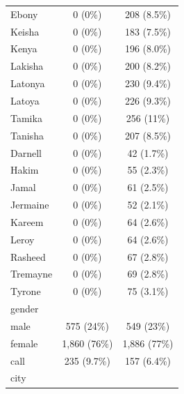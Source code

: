 \documentclass[
  11pt,
]{book}
\numberwithin{equation}{section}
\numberwithin{countremarque}{section}
\begin{document}
\begin{longtable}{lcc}
\addlinespace
\hspace{1em}Ebony & 0 (0\%) & 208 (8.5\%)\\
\hspace{1em}Keisha & 0 (0\%) & 183 (7.5\%)\\
\hspace{1em}Kenya & 0 (0\%) & 196 (8.0\%)\\
\hspace{1em}Lakisha & 0 (0\%) & 200 (8.2\%)\\
\hspace{1em}Latonya & 0 (0\%) & 230 (9.4\%)\\
\addlinespace
\hspace{1em}Latoya & 0 (0\%) & 226 (9.3\%)\\
\hspace{1em}Tamika & 0 (0\%) & 256 (11\%)\\
\hspace{1em}Tanisha & 0 (0\%) & 207 (8.5\%)\\
\hspace{1em}Darnell & 0 (0\%) & 42 (1.7\%)\\
\hspace{1em}Hakim & 0 (0\%) & 55 (2.3\%)\\
\addlinespace
\hspace{1em}Jamal & 0 (0\%) & 61 (2.5\%)\\
\hspace{1em}Jermaine & 0 (0\%) & 52 (2.1\%)\\
\hspace{1em}Kareem & 0 (0\%) & 64 (2.6\%)\\
\hspace{1em}Leroy & 0 (0\%) & 64 (2.6\%)\\
\hspace{1em}Rasheed & 0 (0\%) & 67 (2.8\%)\\
\addlinespace
\hspace{1em}Tremayne & 0 (0\%) & 69 (2.8\%)\\
\hspace{1em}Tyrone & 0 (0\%) & 75 (3.1\%)\\
gender &  & \\
\hspace{1em}male & 575 (24\%) & 549 (23\%)\\
\hspace{1em}female & 1,860 (76\%) & 1,886 (77\%)\\
\addlinespace
call & 235 (9.7\%) & 157 (6.4\%)\\
city &  & \\

\end{longtable}
\end{document}
